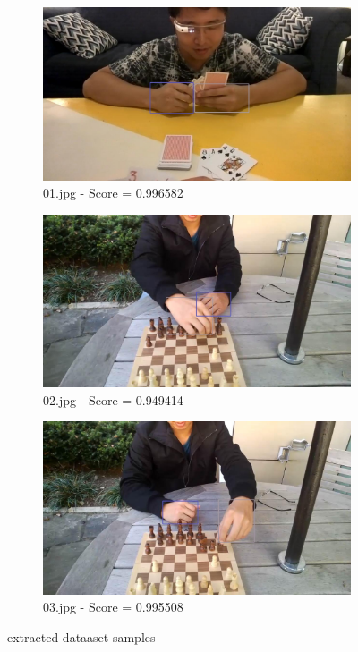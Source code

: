 \begin{figure}[!h]
    \centering
    \begin{subfigure}[b]{0.3 \textwidth}
        \centering
        \includegraphics[width=\textwidth]{images/handDetection/01.jpg}
        \caption{01.jpg - Score = 0.996582}
        
    \end{subfigure}
    \hfill
    \begin{subfigure}[b]{0.3\textwidth}
        \centering
        \includegraphics[width=\textwidth]{images/handDetection/02.jpg}
        \caption{02.jpg - Score = 0.949414}
       
    \end{subfigure}
    \begin{subfigure}[b]{0.3\textwidth}
        \centering
        \includegraphics[width=\textwidth]{images/handDetection/03.jpg}
        \caption{03.jpg - Score = 0.995508}
       
    \end{subfigure}
       \caption{extracted dataaset samples}
       
\end{figure}

